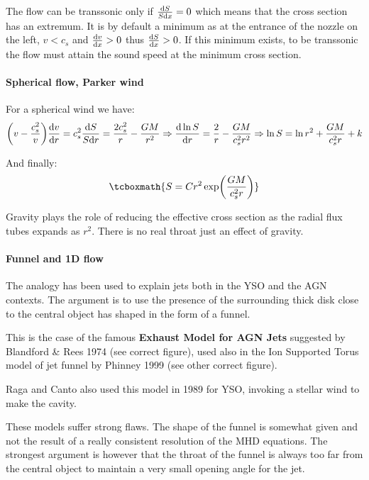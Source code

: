 \documentclass[10pt,a4paper,english]{article}
\let\originalleft\left
\let\originalright\right
\renewcommand{\left}{\mathopen{}\mathclose\bgroup\originalleft}
\renewcommand{\right}{\aftergroup\egroup\originalright}
\begin{document}
The flow can be transsonic only if $\frac{\mathrm{d} S}{S\mathrm{d} x} = 0 $ which means that
the cross section has an extremum. It is by default a minimum as at the
entrance of the nozzle on the left, $v<c_s$ and $\frac{\mathrm{d} v}{\mathrm{d} x} > 0$ thus
$\frac{\mathrm{d} S}{\mathrm{d} x} > 0 $. If this minimum exists, to be transsonic the flow
must attain the sound speed at the minimum cross section.

\paragraph{Spherical flow, Parker wind}

For a spherical wind we have:
\begin{equation}
    \left( v - \frac{c_s^2}{v}  \right)\frac{\d v}{\d r} = c_s^2\frac{\d S}{S\d r}
    = \frac{2c_s^2}{r} - \frac{GM}{r^2} \Rightarrow \frac{\d \ln S}{\d r} =
    \frac{2}{r} - \frac{GM}{c_s^2 r^2}
    \Rightarrow \ln S = \ln r^2 +\frac{GM}{c_s^2r} + k
\end{equation}

And finally:
\begin{equation}
    \tcboxmath{S = Cr^2 \exp\left(\frac{GM}{c_s^2 r}\right)}
\end{equation}

Gravity plays the role of reducing the effective cross section as the radial
flux tubes expands as $r^2$. There is no real throat just an effect of gravity.

\paragraph{Funnel and 1D flow}
The analogy has been used to explain jets both in the YSO and the AGN contexts.
The argument is to use the presence of the surrounding thick disk close to the
central object has shaped in the form of a funnel. 

This is the case of the famous \textbf{ Exhaust Model for AGN Jets} suggested
by Blandford \& Rees 1974 (see correct figure), used also in the Ion Supported
Torus model of jet funnel by Phinney 1999 (see other correct figure).


Raga and Canto also used this model in 1989 for YSO, invoking a stellar wind to
make the cavity.


These models suffer strong flaws. The shape of the funnel is somewhat given and
not the result of a really consistent resolution of the MHD equations. The
strongest argument is however that the throat of the funnel is always too far
from the central object to maintain a very small opening angle for the jet.
\end{document}
